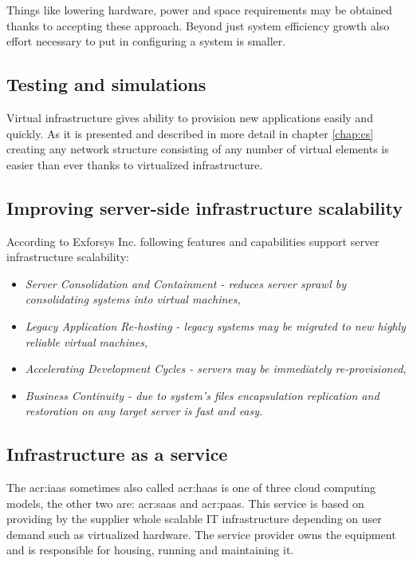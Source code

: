 \documentclass[11pt]{book}
\begin{document}
      Things like lowering hardware, power and space requirements may be obtained thanks to accepting these approach.
      Beyond just system efficiency growth also effort necessary to put in configuring a system is smaller. 


      \subsection{Testing and simulations}

        Virtual infrastructure gives ability to provision new applications easily and quickly. As it is presented and
        described in more detail in chapter \ref{chap:cs} creating any network structure consisting of any number of
        virtual elements is easier than ever thanks to virtualized infrastructure. 


      \subsection{Improving server-side infrastructure scalability}

        According to Exforsys Inc. following features and capabilities support server infrastructure scalability:
	
	\begin{itemize}
		\item \textit{Server Consolidation and Containment  - reduces  server sprawl by 
			consolidating systems into virtual machines,}

		\item \textit{Legacy Application Re-hosting - legacy systems may be migrated to new highly reliable virtual machines,}

		\item \textit{Accelerating Development Cycles - servers may be immediately re-provisioned,}

		\item \textit{Business Continuity - due to system's files encapsulation replication 
			and restoration on any target server is fast and easy. \cite{vib}}

	\end{itemize}


      \subsection{Infrastructure as a service}

        The \gls{acr:iaas} sometimes also called \gls{acr:haas} is one of three cloud computing models, the other two
        are: \gls{acr:saas} and \gls{acr:paas}. This service is based on providing by the supplier whole scalable IT
        infrastructure depending on user demand such as virtualized hardware. The service provider owns the equipment
        and is responsible for housing, running and maintaining it.
\end{document}
